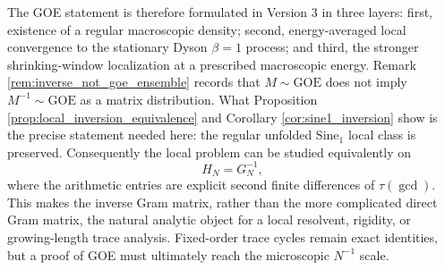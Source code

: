 \documentclass[11pt]{amsart}
\numberwithin{equation}{section}
\theoremstyle{plain}
\theoremstyle{definition}
\theoremstyle{remark}
\begin{document}
The GOE statement is therefore formulated in Version 3 in three layers: first, existence of a regular macroscopic density; second, energy-averaged local convergence to the stationary Dyson $\beta=1$ process; and third, the stronger shrinking-window localization at a prescribed macroscopic energy.  Remark \ref{rem:inverse_not_goe_ensemble} records that $M\sim\mathrm{GOE}$ does not imply $M^{-1}\sim\mathrm{GOE}$ as a matrix distribution.  What Proposition \ref{prop:local_inversion_equivalence} and Corollary \ref{cor:sine1_inversion} show is the precise statement needed here: the regular unfolded $\mathrm{Sine}_1$ local class is preserved.  Consequently the local problem can be studied equivalently on
\begin{equation}
H_N=G_N^{-1},
\end{equation}
where the arithmetic entries are explicit second finite differences of $\tau(\gcd)$.  This makes the inverse Gram matrix, rather than the more complicated direct Gram matrix, the natural analytic object for a local resolvent, rigidity, or growing-length trace analysis.  Fixed-order trace cycles remain exact identities, but a proof of GOE must ultimately reach the microscopic $N^{-1}$ scale.
\end{document}
